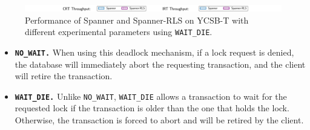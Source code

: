 \begin{figure}[t]
	\centering
	\includegraphics[width=2\columnwidth]{eval-figs/legend_Spanner.png}
	\vspace{1pt}
	\hfill
	\hfill
	\hfill
  
	\caption{Performance of Spanner and Spanner-RLS on YCSB-T with different experimental parameters using \texttt{WAIT\_DIE}.}\label{fig:eval:spanner:wait}
	\vspace{10pt}
\end{figure}

\begin{itemize}[leftmargin=*, itemsep=1.5pt]
    \setlength{\itemsep}{0pt}
    \setlength{\parsep}{0pt}
    \setlength{\parskip}{0pt}
\item \textbf{\texttt{NO\_WAIT.}} When using this deadlock mechanism, if a lock request is denied, the database will immediately abort the requesting transaction, and the client will retire the transaction. 
\item \textbf{\texttt{WAIT\_DIE.}} Unlike \texttt{NO\_WAIT}, \texttt{WAIT\_DIE} allows a transaction to wait for the requested lock if the transaction is older than the one that holds the lock. Otherwise, the transaction is forced to abort and will be retired by the client. 
\end{itemize}

